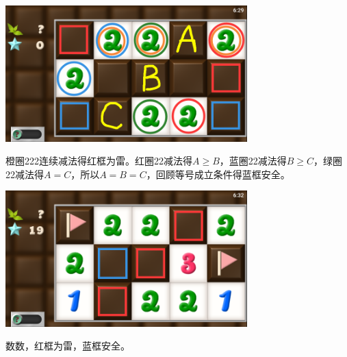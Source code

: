 \subsection{} %
\begin{center}
    \includegraphics[width=0.7\textwidth]{puzzle/107-1.png}
\end{center}
橙圈222连续减法得红框为雷。红圈22减法得$A\ge B$，蓝圈22减法得$B\ge C$，绿圈22减法得$A=C$，所以$A=B=C$，回顾等号成立条件得蓝框安全。
\begin{center}
    \includegraphics[width=0.7\textwidth]{puzzle/107-2.png}
\end{center}
数数，红框为雷，蓝框安全。

